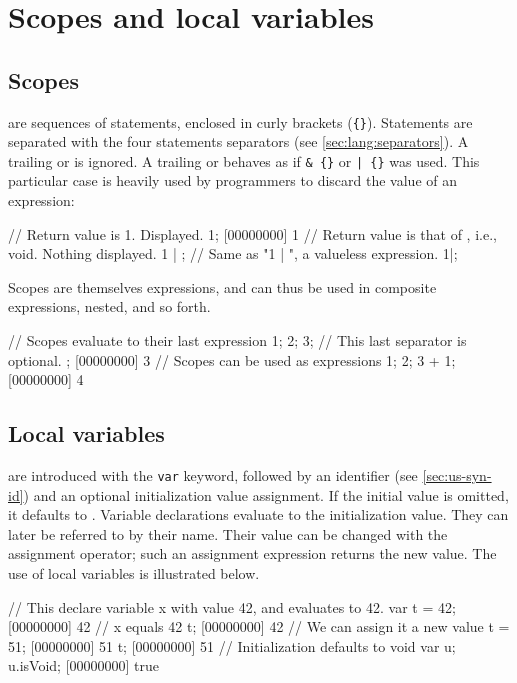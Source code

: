 \section{Scopes and local variables}

\subsection{Scopes}

 are sequences of statements, enclosed in curly brackets
(\lstinline|{}|). Statements are separated with the four statements
separators (see \autoref{sec:lang:separators}).  A trailing \samp{;} or
\samp{,} is ignored.  A trailing \samp{\&} or \samp{|} behaves as if
\lstinline|& {}| or \lstinline'| {}' was used.  This particular case is
heavily used by \us programmers to discard the value of an expression:

\begin{urbiscript}
// Return value is 1.  Displayed.
1;
[00000000] 1
// Return value is that of {}, i.e., void.  Nothing displayed.
1 | {};
// Same as "1 | {}", a valueless expression.
1|;
\end{urbiscript}

Scopes are themselves expressions, and can thus be used in composite
expressions, nested, and so forth.

\begin{urbiscript}
// Scopes evaluate to their last expression
{
  1;
  2;
  3; // This last separator is optional.
};
[00000000] 3
// Scopes can be used as expressions
{1; 2; 3} + 1;
[00000000] 4
\end{urbiscript}

\subsection{Local variables}

 are introduced with the \lstinline|var| keyword,
followed by an identifier (see \autoref{sec:us-syn-id}) and an optional
initialization value assignment. If the initial value is omitted, it
defaults to . Variable declarations evaluate to the
initialization value. They can later be referred to by their name. Their
value can be changed with the assignment operator; such an assignment
expression returns the new value. The use of local variables is illustrated
below.

\begin{urbiscript}
// This declare variable x with value 42, and evaluates to 42.
var t = 42;
[00000000] 42
// x equals 42
t;
[00000000] 42
// We can assign it a new value
t = 51;
[00000000] 51
t;
[00000000] 51
// Initialization defaults to void
var u;
u.isVoid;
[00000000] true
\end{urbiscript}

